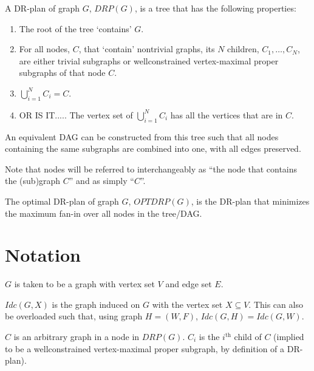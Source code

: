 \documentclass[11pt]{article}
\begin{document}
\begin{definition}
A DR-plan of graph $G$, $DRP(G)$, is a tree that has the following properties:
\begin{enumerate}
    \item The root of the tree `contains' $G$.
    \item For all nodes, $C$, that `contain' nontrivial graphs, its $N$ children, $C_1, \ldots, C_N$, are either trivial subgraphs or wellconstrained vertex-maximal proper subgraphs of that node $C$.
    \item $\bigcup_{i=1}^N{C_i}=C$.
    \item OR IS IT..... The vertex set of $\bigcup_{i=1}^N{C_i}$ has all the vertices that are in $C$.
\end{enumerate}


An equivalent DAG can be constructed from this tree such that all nodes containing the same subgraphs are combined into one, with all edges preserved.

Note that nodes will be referred to interchangeably as ``the node that contains the (sub)graph $C$'' and as simply ``$C$''.
\end{definition}


\begin{definition}
The optimal DR-plan of graph $G$, $OPTDRP(G)$, is the DR-plan that minimizes the maximum fan-in over all nodes in the tree/DAG.
\end{definition}




\section{Notation}
$G$ is taken to be a graph with vertex set $V$ and edge set $E$.

$Idc(G,X)$ is the graph induced on $G$ with the vertex set $X\subseteq V$. This can also be overloaded such that, using graph $H=(W,F)$, $Idc(G,H)=Idc(G,W)$.

$C$ is an arbitrary graph in a node in $DRP(G)$. $C_i$ is the $i^{\text{th}}$ child of $C$ (implied to be a wellconstrained vertex-maximal proper subgraph, by definition of a DR-plan).
\end{document}
